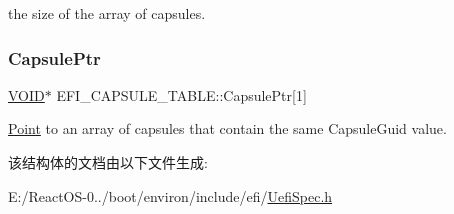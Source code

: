 the size of the array of capsules. \mbox{\label{struct_e_f_i___c_a_p_s_u_l_e___t_a_b_l_e_ac73b66b92796d9820da22cda4d2297a5}} 
\subsubsection{\texorpdfstring{Capsule\+Ptr}{CapsulePtr}}
{\footnotesize\ttfamily \hyperlink{interfacevoid}{V\+O\+ID}$\ast$ E\+F\+I\+\_\+\+C\+A\+P\+S\+U\+L\+E\+\_\+\+T\+A\+B\+L\+E\+::\+Capsule\+Ptr\mbox{[}1\mbox{]}}

\hyperlink{struct_point}{Point} to an array of capsules that contain the same Capsule\+Guid value. 

该结构体的文档由以下文件生成\+:\begin{DoxyCompactItemize}
\item 
E\+:/\+React\+O\+S-\/0../boot/environ/include/efi/\hyperlink{_uefi_spec_8h}{Uefi\+Spec.\+h}\end{DoxyCompactItemize}
